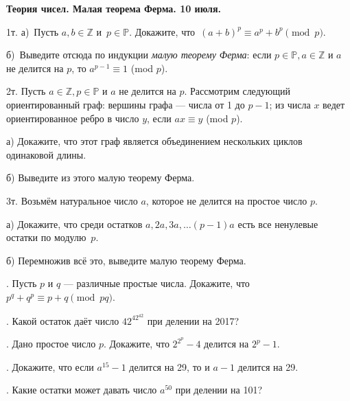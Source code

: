 \begin{center}
\Large
\textbf{Теория чисел. Малая теорема Ферма. 10 июля.}
\end{center}

{\large
\q1т. а)~Пусть $a,b \in \mathbb Z$ и~$p \in \mathbb P$. Докажите,
что~$(a+b)^p \equiv a^p+b^p \pmod{p}$.

б)~Выведите отсюда по индукции { \it малую теорему Ферма}: если $p\in \mathbb{P}, a\in \mathbb{Z}$ и $a$ не делится на $p$, то $a^{p-1}\equiv 1$ (mod $p$).




\q2т.  Пусть $a \in \mathbb{Z}, p \in \mathbb{P}$ и $a$ не делится на $p$. Рассмотрим следующий ориентированный граф: вершины графа — числа от 1 до $p-1$; из числа $x$ ведет ориентированное ребро в число $y$, если $ax \equiv y$ (mod $p$). 

а) Докажите, что этот граф является объединением нескольких циклов одинаковой длины.

б) Выведите из этого { малую теорему Ферма}.

\q3т. Возьмём натуральное число $a$, которое не делится на простое число $p$. 


а) Докажите, что среди остатков $a, 2a, 3a, \ldots (p-1)a$ есть все ненулевые остатки по модулю~$p$. 


б) Перемножив всё это, выведите малую теорему Ферма. 

. Пусть $p$ и $q$ --- различные простые числа. Докажите, что $p^q+q^p \equiv p+q \pmod  {pq}$.


. Какой остаток даёт число $42^{42^{42}}$ при делении на 2017?

.  Дано простое число $p$. Докажите, что $2^{2^p}-4 $ делится на $2^p-1$.

. Докажите, что если $a^{15}-1$ делится на 29, то и $a-1$ делится на 29.

. Какие остатки может давать число $a^{50}$ при делении на 101?}
